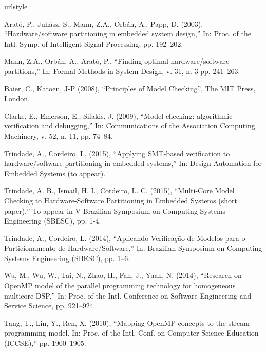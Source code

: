 \begin{thebibliography}{5}
\providecommand{\natexlab}[1]{#1}
\providecommand{\url}[1]{{#1}}
\providecommand{\urlprefix}{URL }
\expandafter\ifx\csname urlstyle\endcsname\relax
  \providecommand{\doi}[1]{DOI~\discretionary{}{}{}#1}\else
  \providecommand{\doi}{DOI~\discretionary{}{}{}\begingroup
  \urlstyle{rm}\Url}\fi
\providecommand{\eprint}[2][]{\url{#2}}

Arat\'o, P., Juh\'asz, S., Mann, Z.A., Orb\'an, A., Papp, D. (2003), ``{Hardware/software partitioning in embedded system design},'' In: Proc. of the Intl. Symp. of Intelligent Signal Processing, pp. 192--202.

Mann, Z.A., Orb\'an, A., Arat\'o, P., ``{Finding optimal hardware/software partitions},'' In: Formal Methods in System Design, v. 31, n. 3 pp. 241--263.

Baier, C., Katoen, J-P (2008), ``{Principles of Model Checking}'', The MIT Press, London.

Clarke, E., Emerson, E., Sifakis, J. (2009), ``{Model checking: algorithmic verification and debugging},'' In: Communications of the Association Computing Machinery, v. 52, n. 11, pp. 74--84.

Trindade, A., Cordeiro. L. (2015), ``{Applying SMT-based verification to hardware/software partitioning in embedded systems,}'' In: Design Automation for Embedded Systems (to appear).

Trindade, A. B., Ismail, H. I., Cordeiro, L. C. (2015), ``{Multi-Core Model Checking to Hardware-Software Partitioning in Embedded Systems (short paper),}'' To appear in V Brazilian Symposium on Computing Systems Engineering (SBESC), pp. 1-4.

Trindade, A., Cordeiro, L. (2014), ``{Aplicando Verificação de Modelos para o Particionamento de Hardware/Software},'' In: Brazilian Symposium on Computing Systems Engineering (SBESC), pp. 1--6.

Wu, M., Wu, W., Tai, N., Zhao, H., Fan, J., Yuan, N. (2014), ``{Research on OpenMP model of the parallel programming technology for homogeneous multicore DSP},'' In: Proc. of the Intl. Conference on Software Engineering and Service Science, pp. 921--924.

Tang, T., Lin, Y., Ren, X. (2010), ``{Mapping OpenMP concepts to the stream programming model. In: Proc. of the Intl. Conf. on Computer Science Education (ICCSE)},'' pp. 1900--1905.


\end{thebibliography}
